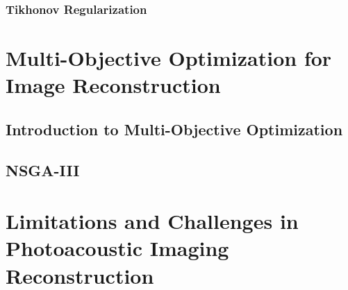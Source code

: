 \subsubsection{Tikhonov Regularization} \label{sec:lit:first:three:two}

\section{Multi-Objective Optimization for Image Reconstruction} \label{sec:lit:second}

\subsection{Introduction to Multi-Objective Optimization} \label{sec:lit:second:one}

\subsection{NSGA-III} \label{sec:lit:second:two}

\section{Limitations and Challenges in Photoacoustic Imaging Reconstruction}

